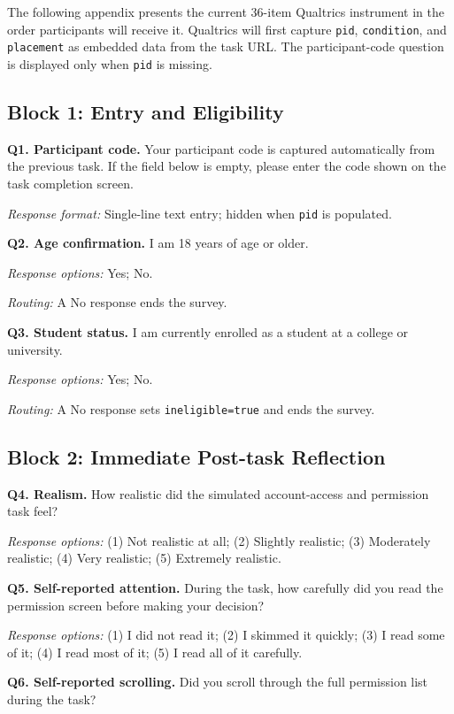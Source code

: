 \documentclass[11pt]{article}
\begin{document}
The following appendix presents the current 36-item Qualtrics instrument in the
order participants will receive it. Qualtrics will first capture
\texttt{pid}, \texttt{condition}, and \texttt{placement} as embedded data from
the task URL. The participant-code question is displayed only when
\texttt{pid} is missing.

\subsection*{Block 1: Entry and Eligibility}

\textbf{Q1. Participant code.}
Your participant code is captured automatically from the previous task. If the
field below is empty, please enter the code shown on the task completion
screen.

\textit{Response format:} Single-line text entry; hidden when
\texttt{pid} is populated.

\textbf{Q2. Age confirmation.}
I am 18 years of age or older.

\textit{Response options:} Yes; No.

\textit{Routing:} A No response ends the survey.

\textbf{Q3. Student status.}
I am currently enrolled as a student at a college or university.

\textit{Response options:} Yes; No.

\textit{Routing:} A No response sets \texttt{ineligible=true} and ends the
survey.

\subsection*{Block 2: Immediate Post-task Reflection}

\textbf{Q4. Realism.}
How realistic did the simulated account-access and permission task feel?

\textit{Response options:} (1) Not realistic at all; (2) Slightly realistic;
(3) Moderately realistic; (4) Very realistic; (5) Extremely realistic.

\textbf{Q5. Self-reported attention.}
During the task, how carefully did you read the permission screen before
making your decision?

\textit{Response options:} (1) I did not read it; (2) I skimmed it quickly;
(3) I read some of it; (4) I read most of it; (5) I read all of it carefully.

\textbf{Q6. Self-reported scrolling.}
Did you scroll through the full permission list during the task?
\end{document}
